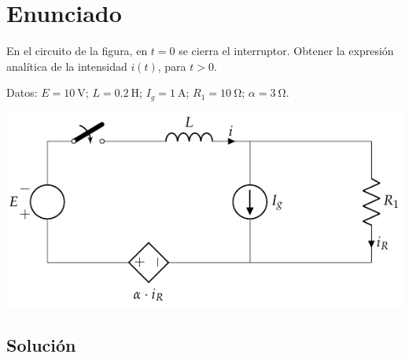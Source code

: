 \section{Enunciado}
En el circuito de la figura, en $t = 0$ se cierra el interruptor. Obtener la expresión analítica de la intensidad $i(t)$, para $t > 0$.

Datos: $E = \qty{10}{\volt}$; $L = \qty{0.2}{\henry}$; $I_g = \qty{1}{\ampere}$; $R_1 = \qty{10}{\ohm}$; $\alpha = \qty{3}{\ohm}$.

\begin{center}
  \includegraphics{figuras/BT4_06.pdf}
\end{center}

\subsection*{Solución}

